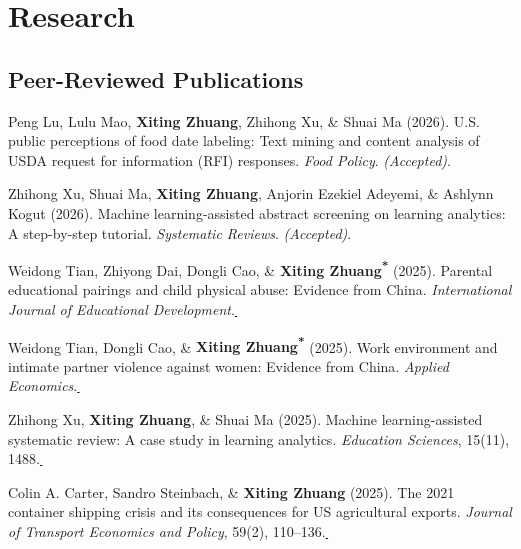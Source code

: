 \documentclass[10.5pt,letterpaper]{article}
\newcommand{\corrauthor}{\textsuperscript{*}}
\newcommand{\paperlink}[1]{\href{#1}{\,\small\faExternalLink}}
\renewenvironment{itemize}{
	\begin{list}{}{
			\setlength{\leftmargin}{1.5em}
		}
	}{
	\end{list}
}
\begin{document}
	\section*{\textbf{Research}}
	
	\subsection*{\textbf{Peer-Reviewed Publications}}
	\begin{itemize}
		
	\item[-] Peng Lu, Lulu Mao, \textbf{Xiting Zhuang}, Zhihong Xu, \& Shuai Ma (2026). U.S. public perceptions of food date labeling: Text mining and content analysis of USDA request for information (RFI) responses. \textit{Food Policy}.  \emph{(Accepted)}.
				
		\item[-] Zhihong Xu, Shuai Ma, \textbf{Xiting Zhuang}, Anjorin Ezekiel Adeyemi, \& Ashlynn Kogut (2026). 
		Machine learning-assisted abstract screening on learning analytics: A step-by-step tutorial. 
		\textit{Systematic Reviews}. \emph{(Accepted)}.
		
		\item[-] Weidong Tian, Zhiyong Dai, Dongli Cao, \& \textbf{Xiting Zhuang\corrauthor} (2025). Parental educational pairings and child physical abuse: Evidence from China. \textit{International Journal of Educational Development}.\paperlink{https://doi.org/10.1016/j.ijedudev.2025.103449}
		
		\item[-] Weidong Tian, Dongli Cao, \& \textbf{Xiting Zhuang\corrauthor} (2025). Work environment and intimate partner violence against women: Evidence from China. \textit{Applied Economics}.\paperlink{https://doi.org/10.1080/00036846.2025.2590113}
		
		\item[-] Zhihong Xu, \textbf{Xiting Zhuang}, \& Shuai Ma (2025). Machine learning-assisted systematic review: A case study in learning analytics. \textit{Education Sciences}, 15(11), 1488.\paperlink{https://doi.org/10.3390/educsci15111488}
		
		\item[-] Colin A. Carter, Sandro Steinbach, \& \textbf{Xiting Zhuang} (2025). The 2021 container shipping crisis and its consequences for US agricultural exports. \textit{Journal of Transport Economics and Policy}, 59(2), 110--136.\paperlink{https://www.ingentaconnect.com/contentone/lse/jtep/2025/00000059/00000002/art00004}
		

\end{itemize}
\end{document}
